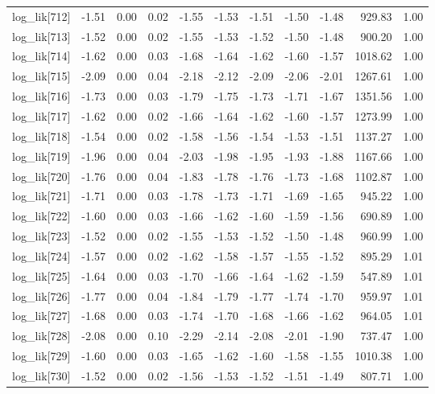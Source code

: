 \begin{table}[ht]
\begin{tabular}{rrrrrrrrrrr}
  log\_lik[712] & -1.51 & 0.00 & 0.02 & -1.55 & -1.53 & -1.51 & -1.50 & -1.48 & 929.83 & 1.00 \\ 
  log\_lik[713] & -1.52 & 0.00 & 0.02 & -1.55 & -1.53 & -1.52 & -1.50 & -1.48 & 900.20 & 1.00 \\ 
  log\_lik[714] & -1.62 & 0.00 & 0.03 & -1.68 & -1.64 & -1.62 & -1.60 & -1.57 & 1018.62 & 1.00 \\ 
  log\_lik[715] & -2.09 & 0.00 & 0.04 & -2.18 & -2.12 & -2.09 & -2.06 & -2.01 & 1267.61 & 1.00 \\ 
  log\_lik[716] & -1.73 & 0.00 & 0.03 & -1.79 & -1.75 & -1.73 & -1.71 & -1.67 & 1351.56 & 1.00 \\ 
  log\_lik[717] & -1.62 & 0.00 & 0.02 & -1.66 & -1.64 & -1.62 & -1.60 & -1.57 & 1273.99 & 1.00 \\ 
  log\_lik[718] & -1.54 & 0.00 & 0.02 & -1.58 & -1.56 & -1.54 & -1.53 & -1.51 & 1137.27 & 1.00 \\ 
  log\_lik[719] & -1.96 & 0.00 & 0.04 & -2.03 & -1.98 & -1.95 & -1.93 & -1.88 & 1167.66 & 1.00 \\ 
  log\_lik[720] & -1.76 & 0.00 & 0.04 & -1.83 & -1.78 & -1.76 & -1.73 & -1.68 & 1102.87 & 1.00 \\ 
  log\_lik[721] & -1.71 & 0.00 & 0.03 & -1.78 & -1.73 & -1.71 & -1.69 & -1.65 & 945.22 & 1.00 \\ 
  log\_lik[722] & -1.60 & 0.00 & 0.03 & -1.66 & -1.62 & -1.60 & -1.59 & -1.56 & 690.89 & 1.00 \\ 
  log\_lik[723] & -1.52 & 0.00 & 0.02 & -1.55 & -1.53 & -1.52 & -1.50 & -1.48 & 960.99 & 1.00 \\ 
  log\_lik[724] & -1.57 & 0.00 & 0.02 & -1.62 & -1.58 & -1.57 & -1.55 & -1.52 & 895.29 & 1.01 \\ 
  log\_lik[725] & -1.64 & 0.00 & 0.03 & -1.70 & -1.66 & -1.64 & -1.62 & -1.59 & 547.89 & 1.01 \\ 
  log\_lik[726] & -1.77 & 0.00 & 0.04 & -1.84 & -1.79 & -1.77 & -1.74 & -1.70 & 959.97 & 1.01 \\ 
  log\_lik[727] & -1.68 & 0.00 & 0.03 & -1.74 & -1.70 & -1.68 & -1.66 & -1.62 & 964.05 & 1.01 \\ 
  log\_lik[728] & -2.08 & 0.00 & 0.10 & -2.29 & -2.14 & -2.08 & -2.01 & -1.90 & 737.47 & 1.00 \\ 
  log\_lik[729] & -1.60 & 0.00 & 0.03 & -1.65 & -1.62 & -1.60 & -1.58 & -1.55 & 1010.38 & 1.00 \\ 
  log\_lik[730] & -1.52 & 0.00 & 0.02 & -1.56 & -1.53 & -1.52 & -1.51 & -1.49 & 807.71 & 1.00 \\ 

\end{tabular}
\end{table}
